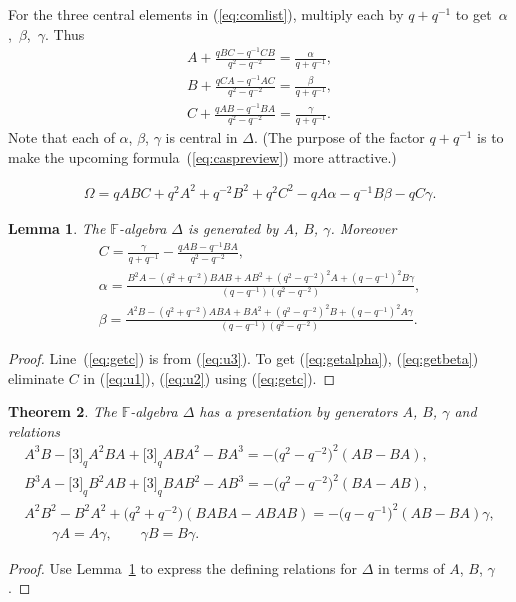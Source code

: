 \documentclass[10pt,a4paper]{amsart}
\numberwithin{equation}{section}
\newtheorem{Theorem}{Theorem}[section]
\newtheorem{Lemma}[Theorem]{Lemma}
\begin{document}
\begin{Definition}
\label{def:abc}
\rm
For the
three central elements in
(\ref{eq:comlist}), multiply each by $q+q^{-1}$ to get~$\alpha$,~$\beta$,~$\gamma$. Thus
\begin{gather}
A+ \frac{qBC-q^{-1}CB}{q^2-q^{-2}}
=
\frac{\alpha}{q+q^{-1}},
\label{eq:u1}
\\
B+
\frac{qCA-q^{-1}AC}{q^2-q^{-2}}
=
\frac{\beta}{q+q^{-1}},
\label{eq:u2}
\\
C+
\frac{qAB-q^{-1}BA}{q^2-q^{-2}}
=
\frac{\gamma}{q+q^{-1}}.
\label{eq:u3}
\end{gather}
Note that each of $\alpha$, $\beta$, $\gamma$ is central in
$\Delta$.
(The purpose of the factor $q+q^{-1}$ is
to make the upcoming formula~(\ref{eq:caspreview})
more attractive.)
\end{Definition}

\begin{gather}
\label{eq:caspreview}
\Omega =
qABC+q^2A^2+q^{-2}B^2+q^2C^2-qA\alpha-q^{-1}B\beta -q C\gamma.
\end{gather}

\begin{Lemma}
\label{lem:abgpres}
The $\mathbb F$-algebra $\Delta $ is generated by
$A$, $B$, $\gamma$. Moreover
\begin{gather}
C  =  \frac{\gamma}{q+q^{-1}}
-\frac{qAB-q^{-1}BA}{q^2-q^{-2}},
\label{eq:getc}
\\
\alpha  =  \frac{B^2A-(q^2+q^{-2})BAB+AB^2+
(q^2-q^{-2})^2A+(q-q^{-1})^2B\gamma}{(q-q^{-1})(q^2-q^{-2})},
\label{eq:getalpha}
\\
\beta  =  \frac{A^2B-(q^2+q^{-2})ABA+BA^2+
(q^2-q^{-2})^2B+(q-q^{-1})^2A\gamma}{(q-q^{-1})(q^2-q^{-2})}.
\label{eq:getbeta}
\end{gather}
\end{Lemma}

\begin{proof}\sloppy
Line~(\ref{eq:getc})
is from (\ref{eq:u3}).
To get
(\ref{eq:getalpha}),
(\ref{eq:getbeta})
eliminate $C$ in
(\ref{eq:u1}),
(\ref{eq:u2})
using
(\ref{eq:getc}).
\end{proof}

{\samepage

\begin{Theorem}
\label{prop:altpres}
The $\mathbb F$-algebra $\Delta $ has a  presentation by generators
$A$, $B$, $\gamma$ and
relations
 \begin{gather*}
 A^3B-\lbrack 3\rbrack_q A^2BA+\lbrack 3\rbrack_q ABA^2-BA^3
= -\big(q^2-q^{-2}\big)^2(AB-BA),
\\
 B^3A-\lbrack 3\rbrack_q B^2AB+\lbrack 3\rbrack_q BAB^2-AB^3
= -\big(q^2-q^{-2}\big)^2(BA-AB),
\\
 A^2B^2-B^2A^2+\big(q^2+q^{-2}\big)(BABA-ABAB) = -\big(q-q^{-1}\big)^2(AB-BA)\gamma,
\\
  \qquad \gamma A = A \gamma,   \qquad \gamma B=B \gamma.
 \end{gather*}
\end{Theorem}

\begin{proof}
Use Lemma~\ref{lem:abgpres} to
express the def\/ining relations
for $\Delta $ in terms of $A$, $B$, $\gamma$.
\end{proof}}
\end{document}
